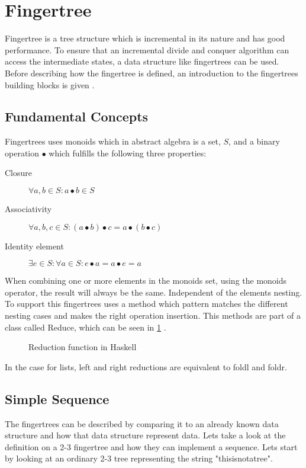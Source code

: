 \newpage

\section{Fingertree}
Fingertree is a tree structure which is incremental in its nature and has good
performance. To ensure that an incremental divide and conquer algorithm can
access the intermediate states, a data structure like fingertrees can be used.
Before describing how the fingertree is defined, an introduction to the
fingertrees building blocks is given \cite{fingertree}.

\subsection{Fundamental Concepts}

Fingertrees uses monoids which in abstract algebra is a set, $S$, and a binary
operation $\bullet$ which fulfills the following
three properties:
\begin{description}
\item[Closure] $\forall a,b \in S: a \bullet b \in S$
\item[Associativity] $\forall a,b,c \in S: (a \bullet b) \bullet c = a \bullet
    (b \bullet c)$ 
\item[Identity element] $\exists e \in S: \forall a \in S: e \bullet a = a
    \bullet e = a$
\end{description}

When combining one or more elements in the monoids set, using the monoids operator,
the result will always be the same. Independent of the elements nesting. To support
this fingertrees uses a method which pattern matches the different nesting cases
and makes the right operation insertion. This methods are part of a class called
Reduce, which can be seen in \cref{fig:Reduction} \cite{fingertree}.

\begin{figure}[h!]

\caption{Reduction function in Haskell \label{fig:Reduction}}
\end{figure}

In the case for lists, left and right reductions are equivalent to foldl and foldr.

\subsection{Simple Sequence}
The fingertrees can be described by comparing it to an already
known data structure and how that data structure represent data. Lets take a look
at the definition on a 2-3 fingertree and how they can implement a sequence.
Lets start by looking at an ordinary 2-3 tree representing the string "thisisnotatree".

